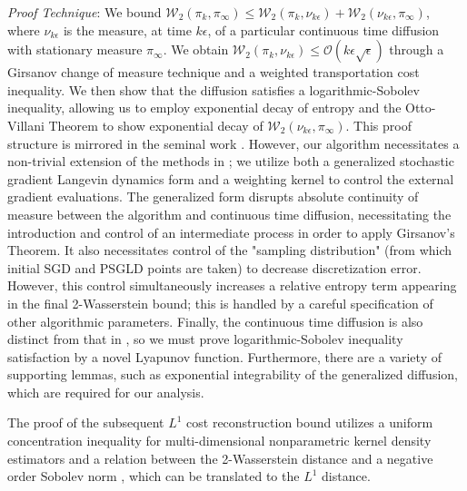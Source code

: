 \documentclass[journal,onecolumn]{IEEEtran}
\newcommand{\step}{\epsilon}
\newcommand{\wass}{\mathcal{W}_2}
\newcommand{\gibbs}{\ids_{\infty}}
\newcommand{\dtlaw}{\ids_{k}} %
\newcommand{\ctlaw}{\nu_{k\step}}
\newcommand{\ids}{\pi}
\newcommand{\idw}{\gamma}
\newcommand{\ksp}{k,\idw}
\begin{document}
\textit{Proof Technique}: We bound $\wass(\dtlaw,\gibbs) \leq \wass(\dtlaw,\ctlaw) + \wass(\ctlaw,\gibbs)$, where $\ctlaw$ is the measure, at time $k\step$, of a particular continuous time diffusion with stationary measure $\gibbs$. We obtain $\wass(\dtlaw,\ctlaw) \leq \mathcal{O}(k\step\sqrt{\step})$ through a Girsanov change of measure technique and a weighted transportation cost inequality. We then show that the diffusion satisfies a logarithmic-Sobolev inequality, allowing us to employ exponential decay of entropy and the Otto-Villani Theorem to show exponential decay of $\wass(\ctlaw,\gibbs)$. This proof structure is mirrored in the seminal work \cite{raginsky2017non}. However, our algorithm necessitates a  non-trivial extension of the methods in \cite{raginsky2017non}; we utilize both a generalized stochastic gradient Langevin dynamics form and a weighting kernel to control the external gradient evaluations. The generalized form disrupts absolute continuity of measure between the algorithm and continuous time diffusion, necessitating the introduction and control of an intermediate process in order to apply Girsanov's Theorem. It also necessitates control of the "sampling distribution" (from which initial SGD and PSGLD points are taken) to decrease discretization error. However, this control simultaneously increases a relative entropy term appearing in the final 2-Wasserstein bound; this is handled by a careful specification of other algorithmic parameters. Finally, the continuous time diffusion is also distinct from that in \cite{raginsky2017non}, so we must prove logarithmic-Sobolev inequality satisfaction by a novel Lyapunov function. Furthermore, there are a variety of supporting lemmas, such as exponential integrability of the generalized diffusion, which are required for our analysis.

{\color{black} The proof of the subsequent $L^1$ cost reconstruction bound utilizes a uniform concentration inequality for multi-dimensional nonparametric kernel density estimators \cite{vogel2013uniform} and a relation between the 2-Wasserstein distance and a negative order Sobolev norm \cite{peyre2018comparison}, which can be translated to the $L^1$ distance.}




\end{document}
